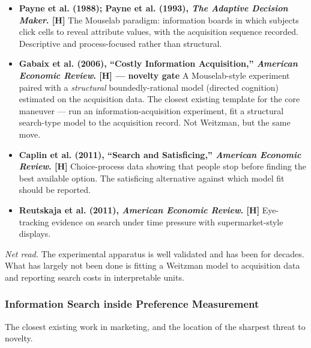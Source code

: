 \documentclass[
  letterpaper,
  DIV=11,
  numbers=noendperiod]{scrartcl}
\providecommand{\tightlist}{%
  \setlength{\itemsep}{0pt}\setlength{\parskip}{0pt}}
\begin{document}
\begin{itemize}
\tightlist
\item
  \textbf{Payne et al. (1988); Payne et al. (1993), \emph{The Adaptive
  Decision Maker}. {[}H{]}} The Mouselab paradigm: information boards in
  which subjects click cells to reveal attribute values, with the
  acquisition sequence recorded. Descriptive and process-focused rather
  than structural.
\item
  \textbf{Gabaix et al. (2006), ``Costly Information Acquisition,''
  \emph{American Economic Review}. {[}H{]} --- novelty gate} A
  Mouselab-style experiment paired with a \emph{structural}
  boundedly-rational model (directed cognition) estimated on the
  acquisition data. The closest existing template for the core maneuver
  --- run an information-acquisition experiment, fit a structural
  search-type model to the acquisition record. Not Weitzman, but the
  same move.
\item
  \textbf{Caplin et al. (2011), ``Search and Satisficing,''
  \emph{American Economic Review}. {[}H{]}} Choice-process data showing
  that people stop before finding the best available option. The
  satisficing alternative against which model fit should be reported.
\item
  \textbf{Reutskaja et al. (2011), \emph{American Economic Review}.
  {[}H{]}} Eye-tracking evidence on search under time pressure with
  supermarket-style displays.
\end{itemize}

\emph{Net read.} The experimental apparatus is well validated and has
been for decades. What has largely not been done is fitting a Weitzman
model to acquisition data and reporting search costs in interpretable
units.

\subsubsection{Information Search inside Preference
Measurement}\label{sec-applit-preference}

The closest existing work in marketing, and the location of the sharpest
threat to novelty.
\end{document}
